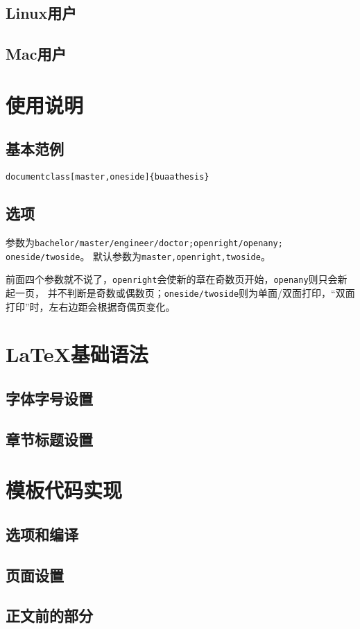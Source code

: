 \documentclass[bachelor]{buaathesis}
\begin{document}
	\section{Linux用户}
	\section{Mac用户}
	
\chapter{使用说明}
	\section{基本范例}
	\texttt{documentclass[master,oneside]\{buaathesis\}}
	\newpage
	\section{选项}
参数为\texttt{bachelor/master/engineer/doctor;openright/openany; oneside/twoside}。
默认参数为\texttt{master,openright,twoside}。\par
前面四个参数就不说了，\texttt{openright}会使新的章在奇数页开始，\texttt{openany}则只会新起一页，
并不判断是奇数或偶数页；\texttt{oneside/twoside}则为单面/双面打印，“双面打印”时，左右边距会根据奇偶页变化。
\chapter{LaTeX{}基础语法}
	\section{字体字号设置}
	\section{章节标题设置}
	
\chapter{模板代码实现}
	\section{选项和编译}
	\section{页面设置}
	\newpage
	\section{正文前的部分}
\end{document}
